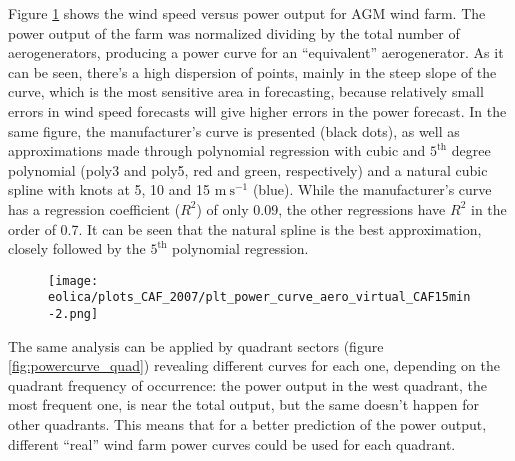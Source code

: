 Figure \ref{fig:powercurve} shows the wind speed versus power output for AGM wind farm. The power output of the farm was normalized dividing by the total number of aerogenerators, producing a power curve for an ``equivalent'' aerogenerator. As it can be seen, there's a high dispersion of points, mainly in the steep slope of the curve, which is the most sensitive area in forecasting, because relatively small errors in wind speed forecasts will give higher errors in the power forecast. In the same figure, the manufacturer's curve is presented (black dots), as well as approximations made through polynomial regression with cubic and $\mathrm{5^{th}}$ degree polynomial (poly3 and poly5, red and green, respectively) and a natural cubic spline with knots at 5, 10 and 15 $\mathrm{m\ s^{-1}}$ (blue). While the manufacturer's curve has a regression coefficient ($R^2$) of only 0.09, the other regressions have $R^2$ in the order of 0.7. It can be seen that the natural spline is the best approximation, closely followed by the $\mathrm{5^{th}}$ polynomial regression. 


\begin{figure}[!htp]
    \centering
    \texttt{[image: eolica/plots\_CAF\_2007/plt\_power\_curve\_aero\_virtual\_CAF15min-2.png]}
    \label{fig:powercurve}
\end{figure}
\FloatBarrier

The same analysis can be applied by quadrant sectors (figure \ref{fig:powercurve_quad}) revealing different curves for each one, depending on the quadrant frequency of occurrence: the power output in the west quadrant, the most frequent one, is near the total output, but the same doesn't happen for other quadrants. This means that for a better prediction of the power output, different ``real'' wind farm power curves could be used for each quadrant. 


